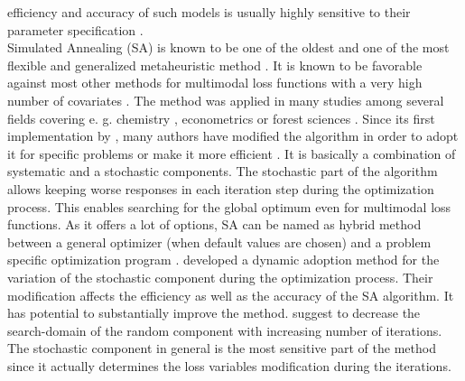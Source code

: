 efficiency and accuracy of such models is usually highly sensitive to their parameter specification \citep{corana_1987}.\\

Simulated Annealing (SA) \citep{kirkpatrick_1983} is known to be one of the oldest and one of the most flexible and generalized metaheuristic method \citep{blum_2003}. It is known to be favorable against most other methods for multimodal loss functions with a very high number of covariates \citep{corana_1987}. The method was applied in many studies among several fields covering e. g. chemistry \citep{agostini_2006}, econometrics \citep{ingber_1993} or forest sciences \citep{baskent_2002}. Since its first implementation by \citet{kirkpatrick_1983}, many authors have modified the algorithm in order to adopt it for specific problems \citep[e. g.][]{desarbo_1989, goffe_1996} or make it more efficient \citep[e. g.][]{xiang_2013}. It is basically a combination of systematic and a stochastic components. The stochastic part of the algorithm allows keeping worse responses in each iteration step during the optimization process. This enables searching for the global optimum even for multimodal loss functions. As it offers a lot of options, SA can be named as hybrid method between a general optimizer (when default values are chosen) and a problem specific optimization program \citep{wegener_2005}. \citet{corana_1987} developed a dynamic adoption method for the variation of the stochastic component during the optimization process. Their modification affects the efficiency as well as the accuracy of the SA algorithm. It has potential to substantially improve the method. \citet{pronzato_1984} suggest to decrease the search-domain of the random component with increasing number of iterations. The stochastic component in general is the most sensitive part of the method since it actually determines the loss variables modification during the iterations.\\

